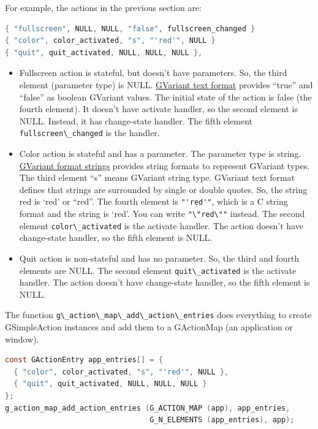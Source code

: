 For example, the actions in the previous section are:

\begin{lstlisting}[language=C]
{ "fullscreen", NULL, NULL, "false", fullscreen_changed }
{ "color", color_activated, "s", "'red'", NULL }
{ "quit", quit_activated, NULL, NULL, NULL },
\end{lstlisting}

\begin{itemize}
\tightlist
\item
  Fullscreen action is stateful, but doesn't have parameters. So, the
  third element (parameter type) is NULL.
  \href{https://docs.gtk.org/glib/gvariant-text.html}{GVariant text
  format} provides ``true'' and ``false'' as boolean GVariant values.
  The initial state of the action is false (the fourth element). It
  doesn't have activate handler, so the second element is NULL. Instead,
  it has change-state handler. The fifth element
  \passthrough{\lstinline!fullscreen\_changed!} is the handler.
\item
  Color action is stateful and has a parameter. The parameter type is
  string.
  \href{https://docs.gtk.org/glib/gvariant-format-strings.html}{GVariant
  format strings} provides string formats to represent GVariant types.
  The third element ``s'' means GVariant string type. GVariant text
  format defines that strings are surrounded by single or double quotes.
  So, the string red is `red' or ``red''. The fourth element is
  \passthrough{\lstinline!"'red'"!}, which is a C string format and the
  string is `red'. You can write \passthrough{\lstinline!"\\"red\\""!}
  instead. The second element \passthrough{\lstinline!color\_activated!}
  is the activate handler. The action doesn't have change-state handler,
  so the fifth element is NULL.
\item
  Quit action is non-stateful and has no parameter. So, the third and
  fourth elements are NULL. The second element
  \passthrough{\lstinline!quit\_activated!} is the activate handler. The
  action doesn't have change-state handler, so the fifth element is
  NULL.
\end{itemize}

The function
\passthrough{\lstinline!g\_action\_map\_add\_action\_entries!} does
everything to create GSimpleAction instances and add them to a
GActionMap (an application or window).

\begin{lstlisting}[language=C]
const GActionEntry app_entries[] = {
  { "color", color_activated, "s", "'red'", NULL },
  { "quit", quit_activated, NULL, NULL, NULL }
};
g_action_map_add_action_entries (G_ACTION_MAP (app), app_entries,
                                 G_N_ELEMENTS (app_entries), app);
\end{lstlisting}

